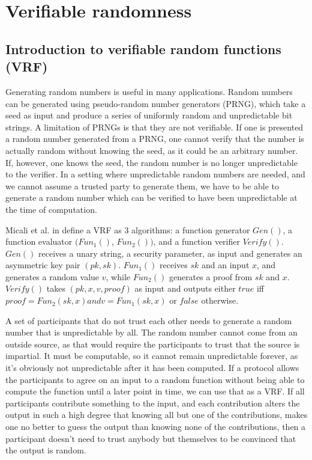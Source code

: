 \section{Verifiable randomness}
\label{sec:vrf}

\subsection{Introduction to verifiable random functions (VRF)}

Generating random numbers is useful in many applications. Random numbers can be generated using pseudo-random number generators (PRNG), which take a seed as input and produce a series of uniformly random and unpredictable bit strings. A limitation of PRNGs is that they are not verifiable. If one is presented a random number generated from a PRNG, one cannot verify that the number is actually random without knowing the seed, as it could be an arbitrary number. If, however, one knows the seed, the random number is no longer unpredictable to the verifier. In a setting where unpredictable random numbers are needed, and we cannot assume a trusted party to generate them, we have to be able to generate a random number which can be verified to have been unpredictable at the time of computation.

Micali et al. in \cite{micali_verifiable_1999} define a VRF as 3 algorithms: a function generator $Gen()$, a function evaluator $(Fun_1()$, $Fun_2())$, and a function verifier $Verify()$. $Gen()$ receives a unary string, a security parameter, as input and generates an asymmetric key pair $(pk, sk)$. $Fun_1()$ receives $sk$ and an input $x$, and generates a random value $v$, while $Fun_2()$ generates a proof from $sk$ and $x$. $Verify()$ takes $(pk, x, v, proof)$ as input and outputs either $true$ iff $proof=Fun_2(sk, x) and v=Fun_1(sk, x)$ or $false$ otherwise.

A set of participants that do not trust each other needs to generate a random number that is unpredictable by all. The random number cannot come from an outside source, as that would require the participants to trust that the source is impartial. It must be computable, so it cannot remain unpredictable forever, as it's obviously not unpredictable after it has been computed. If a protocol allows the participants to agree on an input to a random function without being able to compute the function until a later point in time, we can use that as a VRF. If all participants contribute something to the input, and each contribution alters the output in such a high degree that knowing all but one of the contributions, makes one no better to guess the output than knowing none of the contributions, then a participant doesn't need to trust anybody but themselves to be convinced that the output is random.

